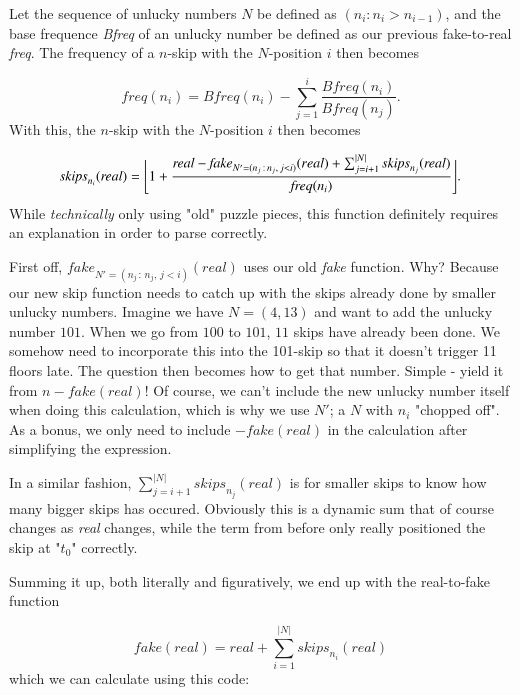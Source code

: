 \documentclass{article}
\DeclarePairedDelimiter\floor{\lfloor}{\rfloor}
\begin{document}
Let the sequence of unlucky numbers $N$ be defined as $(n_i : n_i > n_{i-1})$, and the base frequence  \textit{Bfreq} of an unlucky number be defined as our previous fake-to-real \textit{freq}. The frequency of a $n$-skip with the $N$-position $i$ then becomes

\[\mathit{freq}(n_i) = \textit{Bfreq}(n_i) - \sum_{j = 1}^{i} \frac{\textit{Bfreq}(n_i)}{\textit{Bfreq}(n_j)}.\]
With this, the $n$-skip with the $N$-position $i$ then becomes

\[\mathit{skips}_{n_i}(\mathit{real}) = \floor[\Bigg]{1 +  
    \frac{\mathit{real} - \mathit{fake}_{N' = (n_j\,:\,n_j, \,j < i)}(real) + \sum_{j = i + 1}^{|N|} \mathit{skips}_{n_j}(\mathit{real})}
         {\mathit{freq}(n_i)}  }. \]
While \textit{technically} only using "old" puzzle pieces, this function definitely requires an explanation in order to parse correctly. 

First off, $\mathit{fake}_{N' = (n_j\,:\,n_j, \,j < i)}(real)$ uses our old \textit{fake} function. Why? Because our new skip function needs to catch up with the skips already done by smaller unlucky numbers. Imagine we have $N = (4, 13)$ and want to add the unlucky number $101$. When we go from $100$ to $101$, $11$ skips have already been done. We somehow need to incorporate this into the 101-skip so that it doesn't trigger 11 floors late. The question then becomes how to get that number. Simple - yield it from $n - fake(real)$! Of course, we can't include the new unlucky number itself when doing this calculation, which is why we use $N'$; a $N$ with $n_i$ "chopped off". As a bonus, we only need to include $- fake(real)$ in the calculation after simplifying the expression.

In a similar fashion, $\sum_{j = i + 1}^{|N|} \mathit{skips}_{n_j}(\mathit{real})$ is for smaller skips to know how many bigger skips has occured. Obviously this is a dynamic sum that of course changes as \textit{real} changes, while the term from before only really positioned the skip at "$t_0$" correctly.

Summing it up, both literally and figuratively, we end up with the real-to-fake function

\[\mathit{fake}(\mathit{real}) = \mathit{real} + \sum_{i=1}^{|N|} \mathit{skips}_{n_i}(\mathit{real}) \]
which we can calculate using this code:
\end{document}
